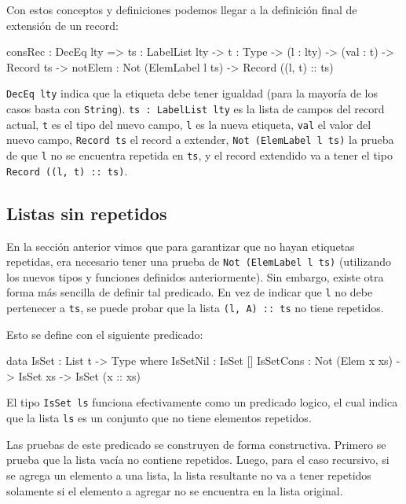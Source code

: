 Con estos conceptos y definiciones podemos llegar a la definición final de extensión de un record:

\begin{code}
consRec : DecEq lty => {ts : LabelList lty} -> 
  {t : Type} -> (l : lty) -> (val : t) ->
  Record ts -> {notElem : Not (ElemLabel l ts)} -> 
  Record ((l, t) :: ts)
\end{code}

\texttt{DecEq lty} indica que la etiqueta debe tener igualdad (para la mayoría de los casos basta con \texttt{String}). \texttt{ts : LabelList lty} es la lista de campos del record actual, \texttt{t} es el tipo del nuevo campo, \texttt{l} es la nueva etiqueta, \texttt{val} el valor del nuevo campo, \texttt{Record ts} el record a extender, \texttt{Not (ElemLabel l ts)} la prueba de que \texttt{l} no se encuentra repetida en \texttt{ts}, y el record extendido va a tener el tipo \texttt{Record ((l, t) :: ts)}.

\subsection{Listas sin repetidos}

En la sección anterior vimos que para garantizar que no hayan etiquetas repetidas, era necesario tener una prueba de \texttt{Not (ElemLabel l ts)} (utilizando los nuevos tipos y funciones definidos anteriormente). Sin embargo, existe otra forma más sencilla de definir tal predicado. En vez de indicar que \texttt{l} no debe pertenecer a \texttt{ts}, se puede probar que la lista \texttt{(l, A) :: ts} no tiene repetidos.

Esto se define con el siguiente predicado:

\begin{code}
data IsSet : List t -> Type where
  IsSetNil : IsSet []
  IsSetCons : Not (Elem x xs) -> IsSet xs -> 
    IsSet (x :: xs)
\end{code}

El tipo \texttt{IsSet ls} funciona efectivamente como un predicado logico, el cual indica que la lista \texttt{ls} es un conjunto que no tiene elementos repetidos.

Las pruebas de este predicado se construyen de forma constructiva. Primero se prueba que la lista vacía no contiene repetidos. Luego, para el caso recursivo, si se agrega un elemento a una lista, la lista resultante no va a tener repetidos solamente si el elemento a agregar no se encuentra en la lista original.


